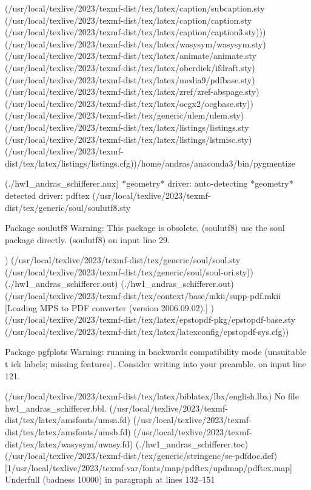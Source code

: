 (/usr/local/texlive/2023/texmf-dist/tex/latex/caption/subcaption.sty
(/usr/local/texlive/2023/texmf-dist/tex/latex/caption/caption.sty
(/usr/local/texlive/2023/texmf-dist/tex/latex/caption/caption3.sty)))
(/usr/local/texlive/2023/texmf-dist/tex/latex/wasysym/wasysym.sty)
(/usr/local/texlive/2023/texmf-dist/tex/latex/animate/animate.sty
(/usr/local/texlive/2023/texmf-dist/tex/latex/oberdiek/ifdraft.sty)
(/usr/local/texlive/2023/texmf-dist/tex/latex/media9/pdfbase.sty)
(/usr/local/texlive/2023/texmf-dist/tex/latex/zref/zref-abspage.sty)
(/usr/local/texlive/2023/texmf-dist/tex/latex/ocgx2/ocgbase.sty))
(/usr/local/texlive/2023/texmf-dist/tex/generic/ulem/ulem.sty)
(/usr/local/texlive/2023/texmf-dist/tex/latex/listings/listings.sty
(/usr/local/texlive/2023/texmf-dist/tex/latex/listings/lstmisc.sty)
(/usr/local/texlive/2023/texmf-dist/tex/latex/listings/listings.cfg))/home/andras/anaconda3/bin/pygmentize

(./hw1_andras_schifferer.aux)
*geometry* driver: auto-detecting
*geometry* detected driver: pdftex
(/usr/local/texlive/2023/texmf-dist/tex/generic/soul/soulutf8.sty

Package soulutf8 Warning: This package is obsolete,
(soulutf8)                use the soul package directly. 
(soulutf8)                 on input line 29.

) (/usr/local/texlive/2023/texmf-dist/tex/generic/soul/soul.sty
(/usr/local/texlive/2023/texmf-dist/tex/generic/soul/soul-ori.sty))
(./hw1_andras_schifferer.out) (./hw1_andras_schifferer.out)
(/usr/local/texlive/2023/texmf-dist/tex/context/base/mkii/supp-pdf.mkii
[Loading MPS to PDF converter (version 2006.09.02).]
) (/usr/local/texlive/2023/texmf-dist/tex/latex/epstopdf-pkg/epstopdf-base.sty
(/usr/local/texlive/2023/texmf-dist/tex/latex/latexconfig/epstopdf-sys.cfg))

Package pgfplots Warning: running in backwards compatibility mode (unsuitable t
ick labels; missing features). Consider writing \pgfplotsset{compat=1.18} into 
your preamble.
 on input line 121.

(/usr/local/texlive/2023/texmf-dist/tex/latex/biblatex/lbx/english.lbx)
No file hw1_andras_schifferer.bbl.
(/usr/local/texlive/2023/texmf-dist/tex/latex/amsfonts/umsa.fd)
(/usr/local/texlive/2023/texmf-dist/tex/latex/amsfonts/umsb.fd)
(/usr/local/texlive/2023/texmf-dist/tex/latex/wasysym/uwasy.fd)
(./hw1_andras_schifferer.toc)
(/usr/local/texlive/2023/texmf-dist/tex/generic/stringenc/se-pdfdoc.def)
[1{/usr/local/texlive/2023/texmf-var/fonts/map/pdftex/updmap/pdftex.map}]
Underfull \hbox (badness 10000) in paragraph at lines 132--151


